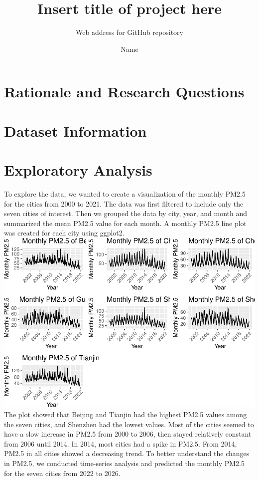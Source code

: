 \documentclass[
  12pt,
]{article}
\title{Insert title of project here}
\subtitle{Web address for GitHub repository}
\author{Name}
\date{}
\begin{document}
\maketitle

\newpage
\tableofcontents 
\newpage
\listoftables 
\newpage
\listoffigures 
\newpage

\hypertarget{rationale-and-research-questions}{%
\section{Rationale and Research
Questions}\label{rationale-and-research-questions}}

\newpage

\hypertarget{dataset-information}{%
\section{Dataset Information}\label{dataset-information}}

\newpage

\hypertarget{exploratory-analysis}{%
\section{Exploratory Analysis}\label{exploratory-analysis}}

To explore the data, we wanted to create a visualization of the monthly
PM2.5 for the cities from 2000 to 2021. The data was first filtered to
include only the seven cities of interest. Then we grouped the data by
city, year, and month and summarized the mean PM2.5 value for each
month. A monthly PM2.5 line plot was created for each city using
ggplot2.
\includegraphics{LiFangRenZhang_ENV872_Project_files/figure-latex/TSA Visualization-1.pdf}
The plot showed that Beijing and Tianjin had the highest PM2.5 values
among the seven cities, and Shenzhen had the lowest values. Most of the
cities seemed to have a slow increase in PM2.5 from 2000 to 2006, then
stayed relatively constant from 2006 until 2014. In 2014, most cities
had a spike in PM2.5. From 2014, PM2.5 in all cities showed a decreasing
trend. To better understand the changes in PM2.5, we conducted
time-series analysis and predicted the monthly PM2.5 for the seven
cities from 2022 to 2026.
\end{document}
